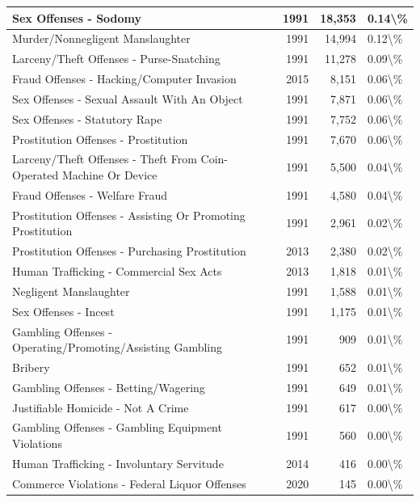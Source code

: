 \documentclass[
]{krantz}
\begin{document}
\begin{longtable}[t]{l|r|r|l}
\hline
Sex Offenses - Sodomy & 1991 & 18,353 & 0.14\textbackslash{}\%\\
\hline
Murder/Nonnegligent Manslaughter & 1991 & 14,994 & 0.12\textbackslash{}\%\\
\hline
Larceny/Theft Offenses - Purse-Snatching & 1991 & 11,278 & 0.09\textbackslash{}\%\\
\hline
Fraud Offenses - Hacking/Computer Invasion & 2015 & 8,151 & 0.06\textbackslash{}\%\\
\hline
Sex Offenses - Sexual Assault With An Object & 1991 & 7,871 & 0.06\textbackslash{}\%\\
\hline
Sex Offenses - Statutory Rape & 1991 & 7,752 & 0.06\textbackslash{}\%\\
\hline
Prostitution Offenses - Prostitution & 1991 & 7,670 & 0.06\textbackslash{}\%\\
\hline
Larceny/Theft Offenses - Theft From Coin-Operated Machine Or Device & 1991 & 5,500 & 0.04\textbackslash{}\%\\
\hline
Fraud Offenses - Welfare Fraud & 1991 & 4,580 & 0.04\textbackslash{}\%\\
\hline
Prostitution Offenses - Assisting Or Promoting Prostitution & 1991 & 2,961 & 0.02\textbackslash{}\%\\
\hline
Prostitution Offenses - Purchasing Prostitution & 2013 & 2,380 & 0.02\textbackslash{}\%\\
\hline
Human Trafficking - Commercial Sex Acts & 2013 & 1,818 & 0.01\textbackslash{}\%\\
\hline
Negligent Manslaughter & 1991 & 1,588 & 0.01\textbackslash{}\%\\
\hline
Sex Offenses - Incest & 1991 & 1,175 & 0.01\textbackslash{}\%\\
\hline
Gambling Offenses - Operating/Promoting/Assisting Gambling & 1991 & 909 & 0.01\textbackslash{}\%\\
\hline
Bribery & 1991 & 652 & 0.01\textbackslash{}\%\\
\hline
Gambling Offenses - Betting/Wagering & 1991 & 649 & 0.01\textbackslash{}\%\\
\hline
Justifiable Homicide - Not A Crime & 1991 & 617 & 0.00\textbackslash{}\%\\
\hline
Gambling Offenses - Gambling Equipment Violations & 1991 & 560 & 0.00\textbackslash{}\%\\
\hline
Human Trafficking - Involuntary Servitude & 2014 & 416 & 0.00\textbackslash{}\%\\
\hline
Commerce Violations - Federal Liquor Offenses & 2020 & 145 & 0.00\textbackslash{}\%\\

\end{longtable}
\end{document}
